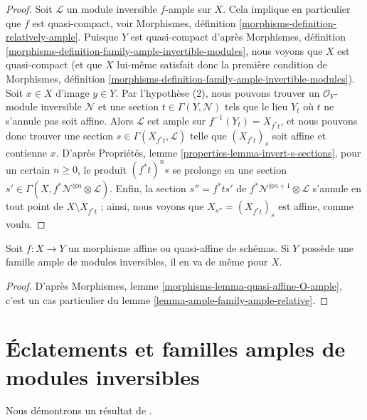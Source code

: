 \begin{proof}
Soit $\mathcal{L}$ un module inversible $f$-ample sur $X$.
Cela implique en particulier que $f$ est quasi-compact, voir
Morphismes, définition \ref{morphisms-definition-relatively-ample}.
Puisque $Y$ est quasi-compact d'après Morphismes, définition
\ref{morphisms-definition-family-ample-invertible-modules},
nous voyons que $X$ est quasi-compact (et que $X$ lui-même satisfait donc la
première condition de Morphismes, définition
\ref{morphisms-definition-family-ample-invertible-modules}).
Soit $x \in X$ d'image $y \in Y$. Par l'hypothèse (2), nous pouvons
trouver un $\mathcal{O}_Y$-module inversible $\mathcal{N}$ et une section
$t \in \Gamma(Y, \mathcal{N})$ tels que le lieu $Y_t$ où $t$
ne s'annule pas soit affine. Alors $\mathcal{L}$ est ample sur
$f^{-1}(Y_t) = X_{f^*t}$, et nous pouvons donc trouver une section
$s \in \Gamma(X_{f^*t}, \mathcal{L})$ telle que $(X_{f^*t})_s$ soit affine
et contienne $x$. D'après
Propriétés, lemme \ref{properties-lemma-invert-s-sections},
pour un certain $n \geq 0$, le produit $(f^*t)^n s$ se prolonge en une section
$s' \in \Gamma(X, f^*\mathcal{N}^{\otimes n} \otimes \mathcal{L})$.
Enfin, la section $s'' = f^* ts'$ de
$f^*\mathcal{N}^{\otimes n + 1} \otimes \mathcal{L}$
s'annule en tout point de $X \setminus X_{f^*t}$ ; ainsi,
nous voyons que $X_{s''} = (X_{f^*t})_s$ est affine, comme voulu.
\end{proof}

\begin{lemma}
\label{lemma-resolution-property-goes-up-affine}
Soit $f : X \to Y$ un morphisme affine ou quasi-affine de schémas.
Si $Y$ possède une famille ample de modules inversibles, il en va de même pour $X$.
\end{lemma}

\begin{proof}
D'après Morphismes, lemme \ref{morphisms-lemma-quasi-affine-O-ample},
c'est un cas particulier du
lemme \ref{lemma-ample-family-ample-relative}.
\end{proof}






\section{Éclatements et familles amples de modules inversibles}
\label{section-ample-family-by-blowing-up}

\noindent
Nous démontrons un résultat de \cite{Gross-thesis}.

